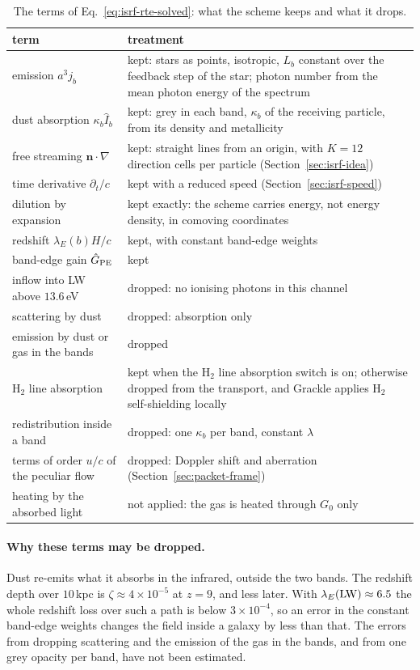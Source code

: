 \begin{table}[htbp]
\centering
\caption{The terms of Eq.~\eqref{eq:isrf-rte-solved}: what the scheme keeps
and what it drops.}
\label{tab:isrf-scope}
\begin{tabular}{>{\raggedright\arraybackslash}p{4.6cm}>{\raggedright\arraybackslash}p{9.6cm}}
\toprule
term & treatment \\
\midrule
emission $a^3j_b$ & kept: stars as points, isotropic, $L_b$ constant over the
  feedback step of the star; photon number from the mean photon energy of
  the spectrum \\
dust absorption $\kappa_b\hat I_b$ & kept: grey in each band, $\kappa_b$ of the
  receiving particle, from its density and metallicity \\
free streaming $\boldsymbol{n}\cdot\nabla$ & kept: straight lines from an
  origin, with $K=12$ direction cells per particle (Section~\ref{sec:isrf-idea}) \\
time derivative $\partial_t/c$ & kept with a reduced speed
  (Section~\ref{sec:isrf-speed}) \\
dilution by expansion & kept exactly: the scheme carries energy, not energy
  density, in comoving coordinates \\
redshift $\lambda_E(b)H/c$ & kept, with constant band-edge weights \\
band-edge gain $\hat G_{\rm PE}$ & kept \\
inflow into LW above $13.6$\,eV & dropped: no ionising photons in this channel \\
scattering by dust & dropped: absorption only \\
emission by dust or gas in the bands & dropped \\
H$_2$ line absorption & kept when the H$_2$ line absorption switch is on;
  otherwise dropped from the transport, and Grackle applies H$_2$
  self-shielding locally \\
redistribution inside a band & dropped: one $\kappa_b$ per band, constant
  $\lambda$ \\
terms of order $u/c$ of the peculiar flow & dropped: Doppler shift and
  aberration (Section~\ref{sec:packet-frame}) \\
heating by the absorbed light & not applied: the gas is heated through $G_0$
  only \\
\bottomrule
\end{tabular}
\end{table}

\paragraph{Why these terms may be dropped.} Dust re-emits what it absorbs in
the infrared, outside the two bands. The redshift depth over $10$\,kpc is
$\zeta\approx4\times10^{-5}$ at $z=9$, and less later. With
$\lambda_E({\rm LW})\approx6.5$ the whole redshift loss over such a path is
below $3\times10^{-4}$, so an error in the constant band-edge weights changes
the field inside a galaxy by less than that. The errors from dropping scattering and the emission of the gas
in the bands, and from one grey opacity per band, have not been estimated.

